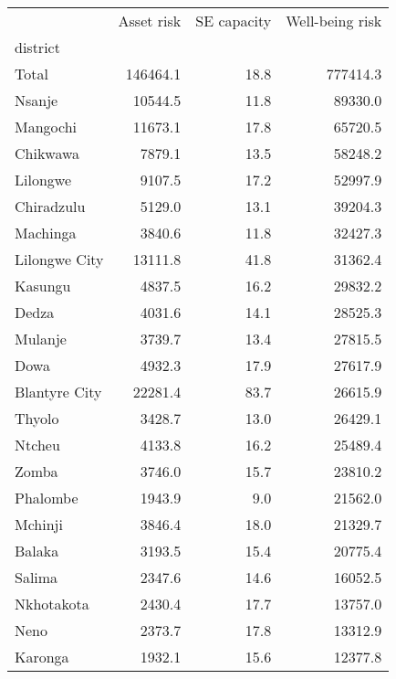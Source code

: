 \begin{tabular}{lrrr}
\toprule
{} &  Asset risk &  SE capacity &  Well-being risk \\
district      &             &              &                  \\
\midrule
Total         &    146464.1 &         18.8 &         777414.3 \\
Nsanje        &     10544.5 &         11.8 &          89330.0 \\
Mangochi      &     11673.1 &         17.8 &          65720.5 \\
Chikwawa      &      7879.1 &         13.5 &          58248.2 \\
Lilongwe      &      9107.5 &         17.2 &          52997.9 \\
Chiradzulu    &      5129.0 &         13.1 &          39204.3 \\
Machinga      &      3840.6 &         11.8 &          32427.3 \\
Lilongwe City &     13111.8 &         41.8 &          31362.4 \\
Kasungu       &      4837.5 &         16.2 &          29832.2 \\
Dedza         &      4031.6 &         14.1 &          28525.3 \\
Mulanje       &      3739.7 &         13.4 &          27815.5 \\
Dowa          &      4932.3 &         17.9 &          27617.9 \\
Blantyre City &     22281.4 &         83.7 &          26615.9 \\
Thyolo        &      3428.7 &         13.0 &          26429.1 \\
Ntcheu        &      4133.8 &         16.2 &          25489.4 \\
Zomba         &      3746.0 &         15.7 &          23810.2 \\
Phalombe      &      1943.9 &          9.0 &          21562.0 \\
Mchinji       &      3846.4 &         18.0 &          21329.7 \\
Balaka        &      3193.5 &         15.4 &          20775.4 \\
Salima        &      2347.6 &         14.6 &          16052.5 \\
Nkhotakota    &      2430.4 &         17.7 &          13757.0 \\
Neno          &      2373.7 &         17.8 &          13312.9 \\
Karonga       &      1932.1 &         15.6 &          12377.8 \\

\end{tabular}
